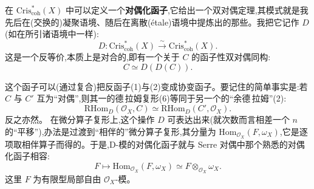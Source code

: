 \noindent 在 $\mathrm{Cris}^{*}_{\mathrm{coh}}(X)$ 中可以定义一个\textbf{对偶化函子},它给出一个双对偶定理,其模式就是我先后在(交换的)凝聚语境、随后在离散(étale)语境中提炼出的那些。我把它记作 $D$(如在所引诸语境中一样):
\begin{equation*}
D : \mathrm{Cris}^{*}_{\mathrm{coh}}(X)\overset{\sim}{\longrightarrow} \mathrm{Cris}^{*}_{\mathrm{coh}}(X).
\tag{8}
\end{equation*}
这是一个反等价,本质上是对合的,即有一个关于 $C$ 的函子性双对偶同构:
\begin{equation*}
C\simeq D(D(C)).
\tag{9}
\end{equation*}

这个函子可以(通过复合)把反函子(1)与(2)变成协变函子。要记住的简单事实是:若 $C$ 与 $C'$ 互为“对偶”,则其一的德\,拉姆复形(6)等同于另一个的“余德\,拉姆”(2):
\begin{equation*}
\mathrm{RHom}_{D}(\mathcal{O}_{X},C)\simeq \mathrm{RHom}_{D}(C',\mathcal{O}_{X}).
\tag{10}
\end{equation*}
反之亦然。
在微分算子复形上,这个操作 $D$ 可表达出来(就次数而言相差一个 $n$ 的“平移”),办法是过渡到“相伴的”微分算子复形,其分量为 $\mathrm{Hom}_{\mathcal{O}_{X}}(F,\omega_{X})$,它是逐项取相伴算子而得的。于是,D-模的对偶化函子就与 Serre 对偶中那个熟悉的对偶化函子相容:
\begin{equation*}
F\mapsto \mathrm{Hom}_{\mathcal{O}_{X}}(F,\omega_{X})\simeq F\otimes_{\mathcal{O}_{X}}\omega_{X}.
\tag{11}
\end{equation*}
这里 $F$ 为有限型局部自由 $\mathcal{O}_{X}$-模。
\noindent {\small [译按:式(11)照录原书;右端的 $F$ 疑漏对偶记号。按左端的定义,应为 $F^{\vee}\otimes_{\mathcal{O}_{X}}\omega_{X}$,其中 $F^{\vee}=\mathrm{Hom}_{\mathcal{O}_{X}}(F,\mathcal{O}_{X})$。]}

